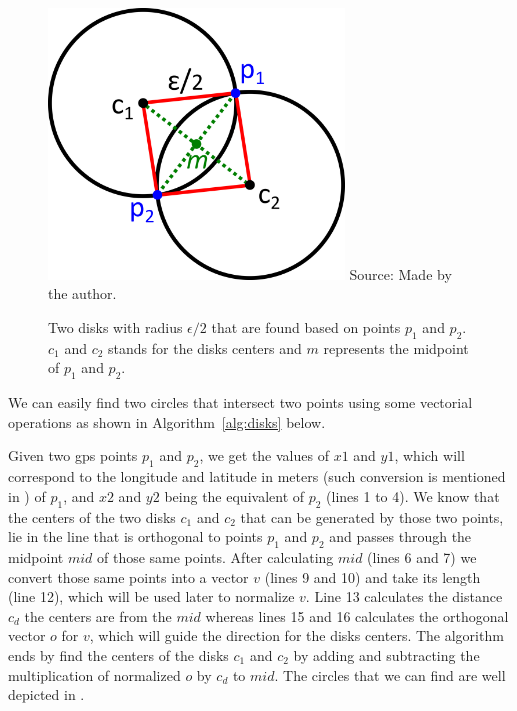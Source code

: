 \begin{figure}[h!]
    \centering
    \caption{Two disks with radius $\epsilon/2$ that are found based on points $p_1$ and $p_2$. $c_1$ and $c_2$ stands
        for the disks centers and $m$ represents the midpoint of $p_1$ and $p_2$.}
    \includegraphics[width=0.7\textwidth]{images/disks_discovery.png}
    \footnotesize{Source: Made by the author.}
    \label{fig:disks_discovery}
\end{figure}

We can easily find two circles that intersect two points using some vectorial operations as shown in
Algorithm~\ref{alg:disks} below.

Given two \ac{gps} points $p_1$ and $p_2$, we get the values of $x1$ and $y1$, which will correspond to the longitude and
latitude in meters (such conversion is mentioned in ) of $p_1$, and $x2$ and $y2$ being the
equivalent of $p_2$ (lines 1 to 4). We know that the centers of the two disks $c_1$ and $c_2$ that can be generated by
those two points, lie in the line that is orthogonal to points $p_1$ and $p_2$ and passes through the midpoint $mid$ of
those same points. After calculating $mid$ (lines 6 and 7) we convert those same points into a vector $v$ (lines 9 and
10) and take its length (line 12), which will be used later to normalize $v$. Line 13 calculates the distance $c_d$ the
centers are from the $mid$ whereas lines 15 and 16 calculates the orthogonal vector $o$ for $v$, which will guide the
direction for the disks centers. The algorithm ends by find the centers of the disks $c_1$ and $c_2$ by adding and
subtracting the multiplication of normalized $o$ by $c_d$ to $mid$. The circles that we can find are well depicted in
.

